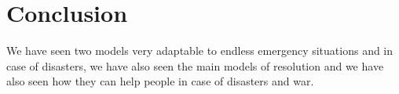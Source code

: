 \section{Conclusion}

We have seen two models very adaptable to endless emergency situations and in case of disasters, we have also seen the main models of resolution and we have also seen how they can help people in case of disasters and war.
